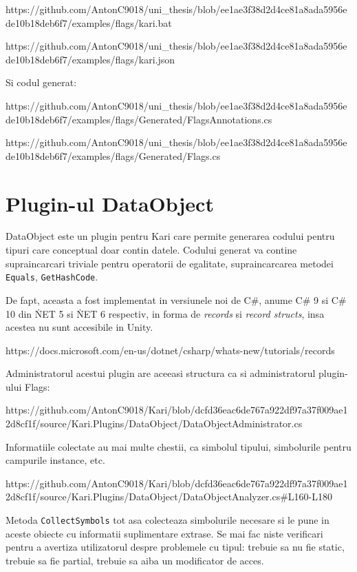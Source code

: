 \documentclass{report}
\begin{document}
https://github.com/AntonC9018/uni\_thesis/blob/ee1ae3f38d2d4ce81a8ada5956ede10b18deb6f7/examples/flags/kari.bat

https://github.com/AntonC9018/uni\_thesis/blob/ee1ae3f38d2d4ce81a8ada5956ede10b18deb6f7/examples/flags/kari.json

Si codul generat:

https://github.com/AntonC9018/uni\_thesis/blob/ee1ae3f38d2d4ce81a8ada5956ede10b18deb6f7/examples/flags/Generated/FlagsAnnotations.cs

https://github.com/AntonC9018/uni\_thesis/blob/ee1ae3f38d2d4ce81a8ada5956ede10b18deb6f7/examples/flags/Generated/Flags.cs

\section{Plugin-ul DataObject}

DataObject este un plugin pentru Kari care permite generarea codului
pentru tipuri care conceptual doar contin datele. Codului generat va
contine supraincarcari triviale pentru operatorii de egalitate,
supraincarcarea metodei \texttt{Equals}, \texttt{GetHashCode}.

De fapt, aceasta a fost implementat in versiunele noi de C\#, anume C\#
9 si C\# 10 din \.NET 5 si \.NET 6 respectiv, in forma de \emph{records}
si \emph{record structs}, insa acestea nu sunt accesibile in Unity.

https://docs.microsoft.com/en-us/dotnet/csharp/whats-new/tutorials/records

Administratorul acestui plugin are aceeasi structura ca si
administratorul plugin-ului Flags:

https://github.com/AntonC9018/Kari/blob/dcfd36eac6de767a922df97a37f009ae12d8cf1f/source/Kari.Plugins/DataObject/DataObjectAdministrator.cs

Informatiile colectate au mai multe chestii, ca simbolul tipului,
simbolurile pentru campurile instance, etc.

https://github.com/AntonC9018/Kari/blob/dcfd36eac6de767a922df97a37f009ae12d8cf1f/source/Kari.Plugins/DataObject/DataObjectAnalyzer.cs\#L160-L180

Metoda \texttt{CollectSymbols} tot asa colecteaza simbolurile necesare
si le pune in aceste obiecte cu informatii suplimentare extrase. Se mai
fac niste verificari pentru a avertiza utilizatorul despre problemele cu
tipul: trebuie sa nu fie static, trebuie sa fie partial, trebuie sa aiba
un modificator de acces.
\end{document}
